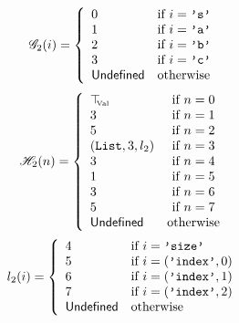 \begin{minipage}{0.45\textwidth}
  \[\mathscr{G}_2(i) = \left\{
    \begin{array}{ll}
      0 & \text{if } i = \texttt{'s'} \\
      1 & \text{if } i = \texttt{'a'} \\
      2 & \text{if } i = \texttt{'b'} \\
      3 & \text{if } i = \texttt{'c'} \\
      \mathsf{Undefined}      & \text{otherwise} \\
    \end{array}
  \right.\]
  \[\mathscr{H}_2(n) = \left\{
    \begin{array}{lcl}
      \top_{\hspace{-1mm}{\text{\tiny{Val}}}} & \text{if } n = 0 \\
      3 & \text{if } n = 1 \\
      5 & \text{if } n = 2 \\
      (\texttt{List}, 3, l_2) & \text{if } n = 3 \\
      3 & \text{if } n = 4 \\
      1 & \text{if } n = 5 \\
      3 & \text{if } n = 6 \\
      5 & \text{if } n = 7 \\
      \mathsf{Undefined} & \text{otherwise} \\
    \end{array}
  \right.\]
  \[l_2(i) = \left\{
    \begin{array}{ll}
      4 & \text{if } i = \texttt{'size'} \\
      5 & \text{if } i = (\texttt{'index'}, 0) \\
      6 & \text{if } i = (\texttt{'index'}, 1) \\
      7 & \text{if } i = (\texttt{'index'}, 2) \\
      \mathsf{Undefined}      & \text{otherwise} \\
    \end{array}
  \right.\]
\end{minipage}\hfill\\[0.4em]


